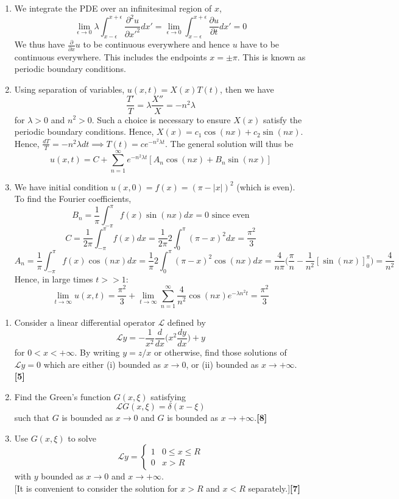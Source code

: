 \documentclass[a4paper]{article}
\begin{document}
\begin{ans}\leavevmode
\begin{enumerate}[label=(\alph*)]
    \item We integrate the PDE over an infinitesimal region of $x$,
$$\lim_{\epsilon\rightarrow0}\lambda\int_{x-\epsilon}^{x+\epsilon}\frac{\partial^2u}{\partial x'^2}dx'=\lim_{\epsilon\rightarrow0}\int_{x-\epsilon}^{x+\epsilon}\frac{\partial u}{\partial t}dx'=0$$
We thus have $\frac{\partial}{\partial x}u$ to be continuous everywhere and hence $u$ have to be continuous everywhere. This includes the endpoints $x=\pm\pi$. This is known as periodic boundary conditions.
\item Using separation of variables, $u(x,t)=X(x)T(t)$, then we have
$$\frac{T'}{T}=\lambda\frac{X''}{X}=-n^2\lambda$$
for $\lambda>0$ and $n^2>0$. Such a choice is necessary to ensure $X(x)$ satisfy the periodic boundary conditions. Hence, $X(x)=c_1\cos(n x)+c_2\sin(n x)$. Hence, $\frac{dT}{T}=-n^2\lambda dt\implies T(t)=ce^{-n^2\lambda t}$. The general solution will thus be
$$u(x,t)=C+\sum_{n=1}^\infty e^{-n^2\lambda t}[A_n\cos(nx)+B_n\sin(nx)]$$
\item We have initial condition $u(x,0)=f(x)=(\pi-|x|)^2$ (which is even). To find the Fourier coefficients,
$$B_n=\frac{1}{\pi}\int_{-\pi}^\pi f(x)\sin(nx)dx=0\text{ since even}$$
$$C=\frac{1}{2\pi}\int_{-\pi}^\pi f(x)dx=\frac{1}{2\pi}2\int_0^\pi(\pi-x)^2dx=\frac{\pi^2}{3}$$
$$A_n=\frac{1}{\pi}\int_{-\pi}^\pi f(x)\cos(nx)dx=\frac{1}{\pi}2\int_0^\pi(\pi-x)^2\cos(nx)dx=\frac{4}{n\pi}\bigg(\frac{\pi}{n}-\frac{1}{n^2}[\sin(nx)]^\pi_0\bigg)=\frac{4}{n^2}$$
Hence, in large times $t>>1$:
$$\lim_{t\rightarrow\infty}u(x,t)=\frac{\pi^2}{3}+\lim_{t\rightarrow\infty}\sum_{n=1}^\infty\frac{4}{n^2}\cos(nx)e^{-\lambda n^2t}=\frac{\pi^2}{3}$$
\end{enumerate}
\end{ans}
\newpage
\begin{qns}\leavevmode
\begin{enumerate}[label=(\alph*)]
    \item Consider a linear differential operator $\mathcal{L}$ defined by
$$\mathcal{L}y=-\frac{1}{x^2}\frac{d}{dx}\bigg(x^2\frac{dy}{dx}\bigg)+y$$
for $0<x<+\infty$. By writing $y=z/x$ or otherwise, find those solutions of $\mathcal{L}y=0$ which are either (i) bounded as $x\rightarrow0$, or (ii) bounded as $x\rightarrow+\infty$.\hfill \textbf{[5]}
\item Find the Green's function $G(x,\xi)$ satisfying
$$\mathcal{L}G(x,\xi)=\delta(x-\xi)$$
such that $G$ is bounded as $x\rightarrow0$ and $G$ is bounded as $x\rightarrow+\infty$.\hfill \textbf{[8]}
\item  Use $G(x,\xi)$ to solve
$$\mathcal{L}y=
\left\{
        \begin{array}{ll}
      1 & 0\leq x\leq R \\
      0 & x>R
        \end{array}
    \right.$$
with $y$ bounded as $x\rightarrow0$ and $x\rightarrow+\infty$.\\[5pt]
[It is convenient to consider the solution for $x>R$ and $x<R$ separately.]\hfill \textbf{[7]}
\end{enumerate}
\end{qns}
\end{document}

